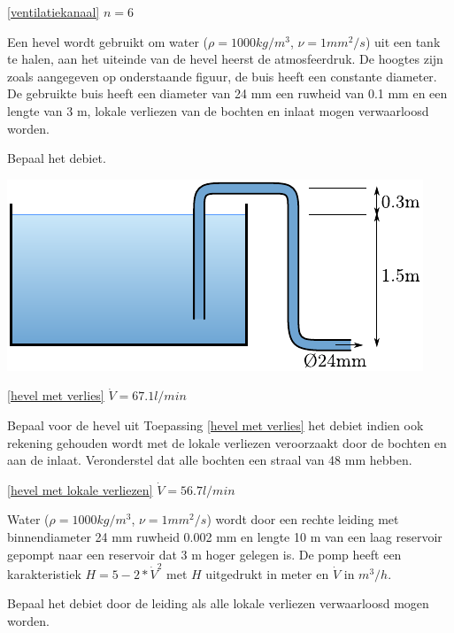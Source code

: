 \begin{antwoord}{\ref{ventilatiekanaal}}
	$n = 6$
\end{antwoord}
\begin{toepassing}
	\label{hevel met verlies}
Een hevel wordt gebruikt om water ($\rho=1000 \unit{kg/m^3}$, $\nu=1 \unit{mm^2/s}$) uit een tank te halen, aan het uiteinde van de hevel heerst de atmosfeerdruk. De hoogtes zijn zoals aangegeven op onderstaande figuur, de buis heeft een constante diameter. De gebruikte buis heeft een diameter van 24 mm een ruwheid van 0.1 mm en een lengte van 3 m, lokale verliezen van de bochten en inlaat mogen verwaarloosd worden.
		
Bepaal het debiet.

	\centering
	\includegraphics{fig/stroming_in_leidingen/hevel}
\end{toepassing}
\begin{antwoord}{\ref{hevel met verlies}}
	$\dot{V} = 67.1 \unit{l/min}$
\end{antwoord}
\begin{toepassing}[*]
	\label{hevel met lokale verliezen}
Bepaal voor de hevel uit Toepassing \ref{hevel met verlies} het debiet indien ook rekening gehouden wordt met de lokale verliezen veroorzaakt door de bochten en aan de inlaat. Veronderstel dat alle bochten een straal van 48 mm hebben.

\end{toepassing}
\begin{antwoord}{\ref{hevel met lokale verliezen}}
	$\dot{V} = 56.7 \unit{l/min}$
\end{antwoord}
\begin{toepassing}[*]
	\label{pompkarakteristiek}
Water ($\rho=1000 \unit{kg/m^3}$, $\nu=1 \unit{mm^2/s}$) wordt door een rechte leiding met binnendiameter 24 mm ruwheid 0.002 mm en lengte 10 m van een laag reservoir gepompt naar een reservoir dat 3 m hoger gelegen is. De pomp heeft een karakteristiek $H = 5 - 2*\dot{V}^2$ met $H$ uitgedrukt in meter en $\dot{V}$ in $\unit{m^3/h}$.

Bepaal het debiet door de leiding als alle lokale verliezen verwaarloosd mogen worden.
\end{toepassing}
